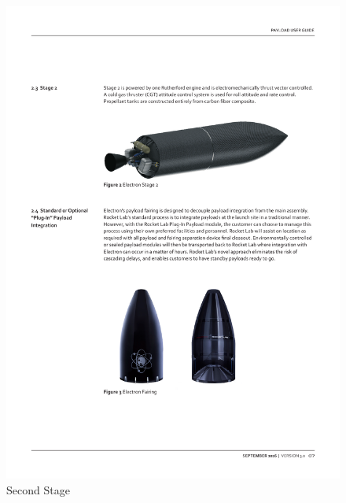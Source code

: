 \begin{figure}[h!]
\centering 
\includegraphics[scale=0.6]{./sections/Constellation_Deployment/S2-Launcher/Images_S2/Picture_2_S2.pdf} 
\caption{Second Stage}
\label{fig:second}
\end{figure}
\newline\newline

